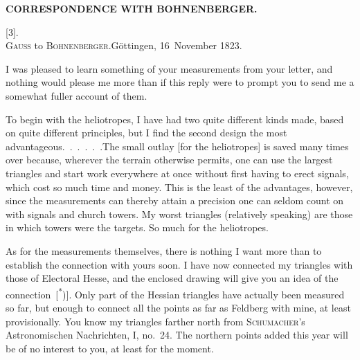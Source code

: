 \noindent{}\hfill{\small\textbf{CORRESPONDENCE WITH BOHNENBERGER.}}\hfill\null\par\medskip

\begin{center}
[3].\\
\textsc{Gauss} to \textsc{Bohnenberger}.\quad Göttingen, 16~November 1823.
\end{center}

\par\noindent\hspace*{\parindent}I was pleased to learn something of your measurements from your letter, and nothing would please me more than if this reply were to prompt you to send me a somewhat fuller account of them.

\par\noindent\hspace*{\parindent}To begin with the heliotropes, I have had two quite different kinds made, based on quite different principles, but I find the second design the most advantageous.\ .\ .\ .\ .\ .\quad The small outlay [for the heliotropes] is saved many times over because, wherever the terrain otherwise permits, one can use the largest triangles and start work everywhere at once without first having to erect signals, which cost so much time and money. This is the least of the advantages, however, since the measurements can thereby attain a precision one can seldom count on with signals and church towers.
My worst triangles (relatively speaking) are those in which towers were the targets.
So much for the heliotropes.

\par\noindent\hspace*{\parindent}As for the measurements themselves, there is nothing I want more than to establish the connection with yours soon.
I have now connected my triangles with those of Electoral Hesse, and the enclosed drawing will give you an idea of the connection~[\textsuperscript{*})].
Only part of the Hessian triangles have actually been measured so far, but enough to connect all the points as far as Feldberg with mine, at least provisionally.
You know my triangles farther north from \textsc{Schumacher}'s Astronomischen Nachrichten, I, no.~24. The northern points added this year will be of no interest to you, at least for the moment.

